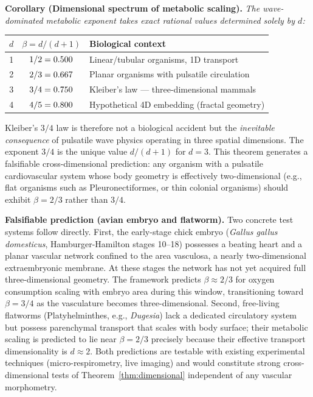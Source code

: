 \documentclass[11pt,a4paper]{article}
\theoremstyle{remark}
\begin{document}
\vspace{0.4em}
\noindent\textbf{Corollary (Dimensional spectrum of metabolic scaling).} \textit{The wave-dominated metabolic exponent takes exact rational values determined solely by $d$:}

\begin{center}
\small
\begin{tabular}{@{}ccl@{}}
\toprule
$d$ & $\beta = d/(d+1)$ & Biological context \\
\midrule
1 & $1/2 = 0.500{}$ & Linear/tubular organisms, 1D transport \\
2 & $2/3 = 0.667{}$ & Planar organisms with pulsatile circulation \\
3 & $3/4 = 0.750{}$ & Kleiber's law --- three-dimensional mammals \\
4 & $4/5 = 0.800{}$ & Hypothetical 4D embedding (fractal geometry) \\
\bottomrule
\end{tabular}
\end{center}

\noindent Kleiber's $3/4$ law is therefore not a biological accident but the \emph{inevitable consequence} of pulsatile wave physics operating in three spatial dimensions. The exponent $3/4$ is the unique value $d/(d+1)$ for $d=3$. This theorem generates a falsifiable cross-dimensional prediction: any organism with a pulsatile cardiovascular system whose body geometry is effectively two-dimensional (e.g., flat organisms such as Pleuronectiformes, or thin colonial organisms) should exhibit $\beta = 2/3$ rather than $3/4$.

\noindent\textbf{Falsifiable prediction (avian embryo and flatworm).} Two concrete test systems follow directly. First, the early-stage chick embryo (\textit{Gallus gallus domesticus}, Hamburger-Hamilton stages 10--18) possesses a beating heart and a planar vascular network confined to the area vasculosa, a nearly two-dimensional extraembryonic membrane. At these stages the network has not yet acquired full three-dimensional geometry. The framework predicts $\beta \approx 2/3$ for oxygen consumption scaling with embryo area during this window, transitioning toward $\beta = 3/4$ as the vasculature becomes three-dimensional. Second, free-living flatworms (Platyhelminthes, e.g., \textit{Dugesia}) lack a dedicated circulatory system but possess parenchymal transport that scales with body surface; their metabolic scaling is predicted to lie near $\beta = 2/3$ precisely because their effective transport dimensionality is $d \approx 2$. Both predictions are testable with existing experimental techniques (micro-respirometry, live imaging) and would constitute strong cross-dimensional tests of Theorem~\ref{thm:dimensional} independent of any vascular morphometry.
\end{document}
